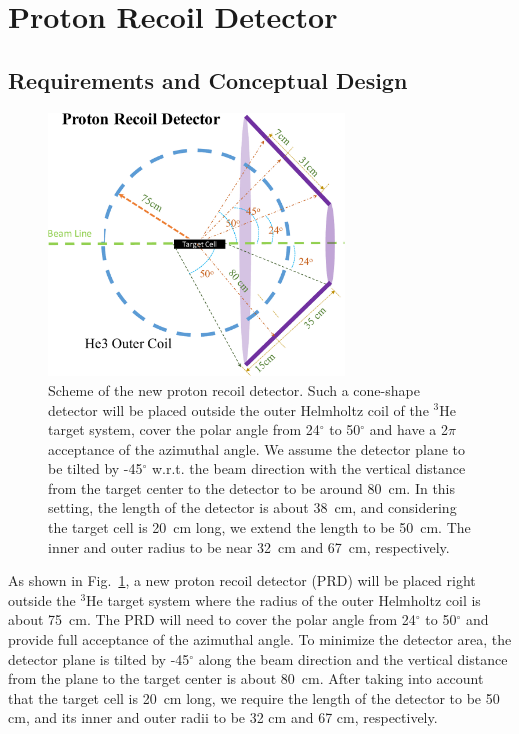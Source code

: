 \section{Proton Recoil Detector}
\subsection{Requirements and Conceptual Design}
\begin{figure}[!ht]
 \begin{center}
  \includegraphics[width=0.7\textwidth]{./figures/PRD-crop.pdf}
   \caption[Scheme of the new proton recoil detector ]{\footnotesize{Scheme of the new proton recoil detector. Such a cone-shape detector will be placed outside the outer Helmholtz coil of the $\mathrm{^{3}He}$ target system, cover the polar angle from 24$^{\circ}$ to  50$^{\circ}$ and have a 2$\pi$ acceptance of the azimuthal angle. We assume the detector plane to be tilted by -45$^{\circ}$ w.r.t. the beam direction with the vertical distance from the target center to the detector to be around 80~cm. In this setting, the length of the detector is about 38~cm, and considering the target cell is 20~cm long, we extend the length to be 50~cm. The inner and outer radius to be near 32~cm and 67~cm, respectively.}}
   \label{prd_concept}
 \end{center}
\end{figure}
As shown in Fig.~\ref{prd_concept}, a new proton recoil detector (PRD) will be placed right outside the $\mathrm{^{3}He}$ target system where the radius of the outer Helmholtz coil is about 75~cm. The PRD will need to cover the polar angle from 24$^{\circ}$ to  50$^{\circ}$ and provide full acceptance of the azimuthal angle. To minimize the detector area, the detector plane is tilted by -45$^{\circ}$ along the beam direction and the vertical distance from the plane to the target center is about 80~cm. After taking into account that the target cell is 20~cm long, we require the length of the detector to be 50 cm, and its inner and outer radii to be 32 cm and 67 cm, respectively.

